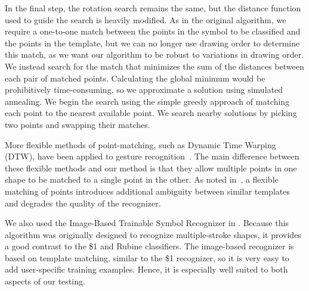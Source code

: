 \documentclass[final,5p,twocolumn]{elsarticle}
\begin{document}
In the final step, the rotation search remains the same, but the
distance function used to guide the search is heavily modified.  
As in the original algorithm, we
require a one-to-one match between the points in the symbol
to be classified and the points in the template, but we can no longer use drawing
order to determine this match, as we want our
algorithm to be robust to variations in drawing order.  We instead 
search for the match that minimizes the sum of the distances between
each pair of matched points. Calculating the global minimum
would be prohibitively time-consuming, so we approximate a
solution using simulated annealing. We begin the search using the
simple greedy approach of matching each point to the nearest available
point. We search nearby solutions by picking two points 
and swapping their matches.

More flexible methods of point-matching, such as Dynamic Time Warping
(DTW), have been applied to gesture
recognition~\cite{dollar,shark2}. The main difference between these
flexible methods and our method is that they allow
multiple points in one shape to be matched to a single point in the
other. As noted in~\cite{shark2}, a flexible matching of points
introduces additional ambiguity between similar templates and degrades
the quality of the recognizer.



We also used the Image-Based Trainable Symbol
Recognizer in \cite{Kara2005ImageBased}.  Because this algorithm was
originally designed to recognize multiple-stroke shapes, it provides a
good contrast to the \$1 and Rubine classifiers. The image-based
recognizer is based on template matching, similar to the \$1
recognizer, so it is very easy to add user-specific training
examples. Hence, it is especially well suited to both aspects of our
testing.
\end{document}
